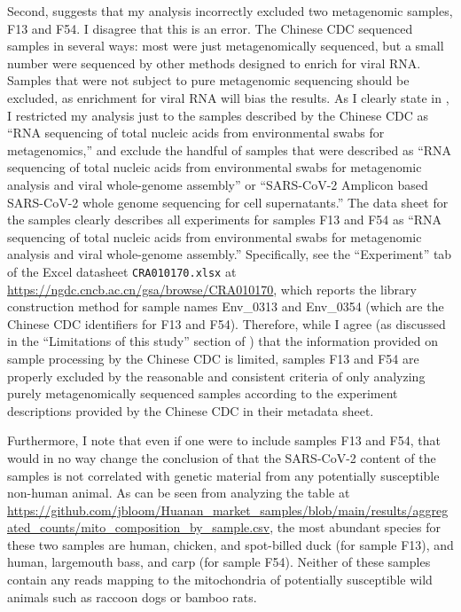 \documentclass[9pt,onecolumn,twoside]{gsajnl_modified}
\begin{document}
Second, \citet{debarre2024what} suggests that my analysis incorrectly excluded two metagenomic samples, F13 and F54.
I disagree that this is an error.
The Chinese CDC sequenced samples in several ways: most were just metagenomically sequenced, but a small number were sequenced by other methods designed to enrich for viral RNA.
Samples that were not subject to pure metagenomic sequencing should be excluded, as enrichment for viral RNA will bias the results.
As I clearly state in \citet{bloom2023association}, I restricted my analysis just to the samples described by the Chinese CDC as ``RNA sequencing of total nucleic acids from environmental swabs for metagenomics,'' and exclude the handful of samples that were described as ``RNA sequencing of total nucleic acids from environmental swabs for metagenomic analysis and viral whole-genome assembly'' or ``SARS-CoV-2 Amplicon based SARS-CoV-2 whole genome sequencing for cell supernatants.''
The data sheet for the samples clearly describes all experiments for samples F13 and F54 as ``RNA sequencing of total nucleic acids from environmental swabs for metagenomic analysis and viral whole-genome assembly.'' 
Specifically, see the ``Experiment'' tab of the Excel datasheet \texttt{CRA010170.xlsx} at \url{https://ngdc.cncb.ac.cn/gsa/browse/CRA010170}, which reports the library construction method for sample names Env\_0313 and Env\_0354 (which are the Chinese CDC identifiers for F13 and F54).
Therefore, while I agree (as discussed in the ``Limitations of this study'' section of \citet{bloom2023association}) that the information provided on sample processing by the Chinese CDC is limited, samples F13 and F54 are properly excluded by the reasonable and consistent criteria of only analyzing purely metagenomically sequenced samples according to the experiment descriptions provided by the Chinese CDC in their metadata sheet.

Furthermore, I note that even if one were to include samples F13 and F54, that would in no way change the conclusion of \citet{bloom2023association} that the SARS-CoV-2 content of the samples is not correlated with genetic material from any potentially susceptible non-human animal.
As can be seen from analyzing the table at \url{https://github.com/jbloom/Huanan_market_samples/blob/main/results/aggregated_counts/mito_composition_by_sample.csv}, the most abundant species for these two samples are human, chicken, and spot-billed duck (for sample F13), and human, largemouth bass, and carp (for sample F54).
Neither of these samples contain any reads mapping to the mitochondria of potentially susceptible wild animals such as raccoon dogs or bamboo rats.
\end{document}

